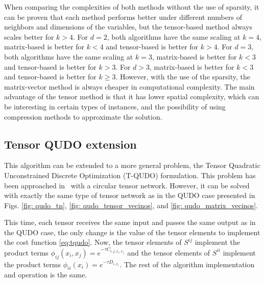 \documentclass[%
 reprint,
 amsmath,amssymb,
 aps,
 pra,showkeys,
]{revtex4-2}
\begin{document}
When comparing the complexities of both methods without the use of sparsity, it can be proven that each method performs better under different numbers of neighbors and dimensions of the variables, but the tensor-based method always scales better for $k>4$. For $d=2$, both algorithms have the same scaling at $k=4$, matrix-based is better for $k<4$ and tensor-based is better for $k>4$. For $d=3$, both algorithms have the same scaling at $k=3$, matrix-based is better for $k<3$ and tensor-based is better for $k>3$. For $d>3$, matrix-based is better for $k<3$ and tensor-based is better for $k\geq 3$. However, with the use of the sparsity, the matrix-vector method is always cheaper in computational complexity. The main advantage of the tensor method is that it has lower spatial complexity, which can be interesting in certain types of instances, and the possibility of using compression methods to approximate the solution.




\subsection{Tensor QUDO extension}\label{ssec: tensor_qudo}
This algorithm can be extended to a more general problem, the Tensor Quadratic Unconstrained Discrete Optimization (T-QUDO) formulation. This problem has been approached in~\cite{melocoton} with a circular tensor network. However, it can be solved with exactly the same type of tensor network as in the QUDO case presented in Figs. \ref{fig: qudo_tn}, \ref{fig: qudo_tensor_vecinos}, and \ref{fig: qudo_matrix_vecinos}.

This time, each tensor receives the same input and passes the same output as in the QUDO case, the only change is the value of the tensor elements to implement the cost function \eqref{eq:tqudo}. Now, the tensor elements of $S^{ij}$ implement the product terms $\phi_{ij}(x_i,x_j) = e^{-\tau C_{i,j,x_i,x_j}}$ and the tensor elements of $S^{ii}$ implement the product terms $\phi_{ii}(x_i)=e^{-\tau D_{i,x_i}}$. The rest of the algorithm implementation and operation is the same.
\end{document}
